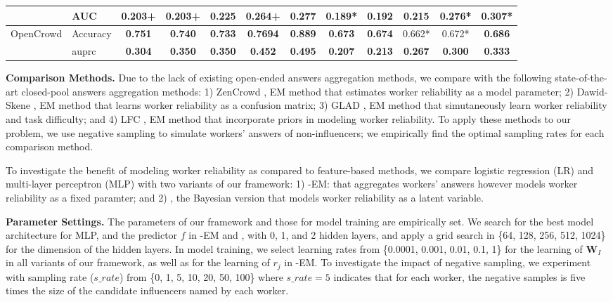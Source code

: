 \begin{table*}[t]
\begin{tabular}{ll|ccccc|ccccc}
                             & AUC   & 0.203+         & 0.203+         & 0.225          & 0.264+         & 0.277          & 0.189*         & 0.192          & 0.215          & 0.276*         & 0.307*         \\ \hline
\multirow{2}{*}{OpenCrowd}   & Accuracy     & \textbf{0.751} & \textbf{0.740} & \textbf{0.733}         & \textbf{0.7694} & \textbf{0.889}  & \textbf{0.673} & \textbf{0.674} & 0.662*         & 0.672*         & \textbf{0.686} \\ %
                             & auprc   & \textbf{0.304} & \textbf{0.350} & \textbf{0.350} & \textbf{0.452} & \textbf{0.495} & \textbf{0.207} & \textbf{0.213} & \textbf{0.267} & \textbf{0.300} & \textbf{0.333} \\ \bottomrule
\end{tabular}
 \label{sec:compres}  
\end{table*}

\smallskip
\noindent\textbf{Comparison Methods.} Due to the lack of existing open-ended answers aggregation methods, we compare with the following state-of-the-art closed-pool answers aggregation methods: 1) ZenCrowd \cite{demartini2012zencrowd}, EM method that estimates worker reliability as a model parameter; 2) Dawid-Skene \cite{dawid1979maximum}, EM method that learns worker reliability as a confusion matrix; 3) GLAD \cite{whitehill2009whose}, EM method that simutaneously learn worker reliability and task difficulty; and 4) LFC \cite{raykar2010learning}, EM method 
that incorporate priors in modeling worker reliability. To apply these methods to our problem, we use negative sampling to simulate workers' answers of non-influencers; we empirically find the optimal sampling rates for each comparison method. 

To investigate the benefit of modeling worker reliability as compared to feature-based methods, we compare logistic regression (LR) and multi-layer perceptron (MLP) with two variants of our framework: 1) \sys-EM: \sys that aggregates workers' answers however models worker reliability as a fixed paramter; and 2) \sys, the Bayesian version that models worker reliability as a latent variable.




\smallskip
\noindent\textbf{Parameter Settings.} The parameters of our framework and those for model training are empirically set. We search for the best model architecture for MLP, and the predictor $f$ in \sys-EM and \sys, with 0, 1, and 2 hidden layers, and apply a grid search in \{64, 128, 256, 512, 1024\} for the dimension of the hidden layers. In model training, we select learning rates from \{0.0001, 0.001, 0.01, 0.1, 1\} for the learning of $\mathbf{W}_I$ in all variants of our framework, as well as for the learning of $r_j$ in \sys-EM. To investigate the impact of negative sampling, we experiment with sampling rate ($s\_rate$) from \{0, 1, 5, 10, 20, 50, 100\} where $s\_rate=5$ indicates that for each worker, the negative samples is five times the size of the candidate influencers named by each worker. 

